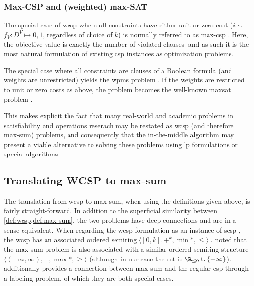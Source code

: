 
\subsubsection{Max-CSP and (weighted) max-SAT}
The special case of \gls{wcsp} where all constraints have either unit or zero cost (\emph{i.e.} \(f_V : D^V \mapsto {0,1}\), regardless of choice of \(k\)) is normally referred to as max-\gls{csp} \parencite[\pno~284]{Meseguer06}.
Here, the objective value is exactly the number of violated clauses, and as such it is the most natural formulation of existing \gls{csp} instances as optimization problems.

The special case where all constraints are clauses of a Boolean formula (and weights are unrestricted) yields the \gls{wpms} problem \parencite[\pno~2]{deGivry14}.
If the weights are restricted to unit or zero costs as above, the problem becomes the well-known \gls{maxsat} problem \parencite[\pno~284]{Meseguer06}.

This makes explicit the fact that many real-world and academic problems in satisfiability and operations reserach may be restated as \gls{wcsp} (and therefore max-sum) problems, and consequently that the in-the-middle algorithm may present a viable alternative to solving these problems using \gls{lp} formulations \parencites{Ansotegui13a}{Davies13} or special algorithms \parencites{Ansotegui13b}{Larrosa08}.


\subsection{Translating WCSP to max-sum}
The translation from \gls{wcsp} to max-sum, when using the definitions given above, is fairly straight-forward.
In addition to the superficial similarity between \cref{def:wcsp,def:max-sum}, the two problems have deep connections and are in a sense equivalent.
When regarding the \gls{wcsp} formulation as an instance of \gls{scsp} \parencite[\pno~285\psq]{Meseguer06}, the \gls{wcsp} has an associated ordered semiring \(\langle [0,k],+^k,\min*,\leq\rangle\) \parencite[\pno~290]{Meseguer06}.
\Textcite[\pno~1167]{Werner07} noted that the max-sum problem is also associated with a similar ordered semiring structure \(\langle (-\infty,\infty),+,\max*,\geq\rangle\) (although in our case the set is \(\Rminus \cup \{-\infty\}\)).
 additionally provides a connection between max-sum and the regular \gls{csp} through a labeling problem, of which they are both special cases.

